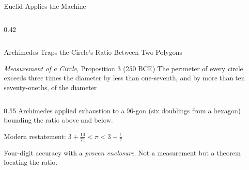 \documentclass[aspectratio=169]{beamer}
\begin{document}
\begin{frame}{Euclid Applies the Machine}
\begin{columns}
\begin{column}{0.42\textwidth}
                \end{column}
        \end{columns}
\end{frame}


\begin{frame}{Archimedes Traps the Circle's Ratio Between Two Polygons}
        \begin{block}{\emph{Measurement of a Circle}, Proposition 3
        (250 BCE)}
                The perimeter of every circle exceeds three times the
                diameter by less than one-seventh, and by more than
                ten seventy-oneths, of the diameter
        \end{block}

        \vspace{0.5em}
        \begin{columns}
                \begin{column}{0.55\textwidth}
                        Archimedes applied exhaustion to a 96-gon
                        (six doublings from a hexagon) bounding the
                        ratio above and below.

                        \vspace{0.7em}
                        Modern restatement:
                        $3 + \tfrac{10}{71} < \pi < 3 + \tfrac{1}{7}$
                        
                        \vspace{0.7em}
                        Four-digit accuracy with a \emph{proven
                        enclosure}. Not a measurement but a theorem
                        locating the ratio.
                \end{column}
                

\end{columns}
\end{frame}
\end{document}
